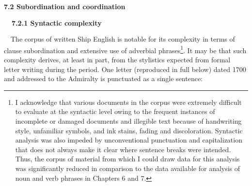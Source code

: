 \begin{styleStandard}
\textbf{7.2 Subordination and coordination}
\end{styleStandard}


\begin{styleStandard}
\textbf{\ \ 7.2.1 Syntactic complexity}
\end{styleStandard}


\begin{styleStandard}
\ \ The corpus of written Ship English is notable for its complexity in terms of clause subordination and extensive use of adverbial phrases\footnote{ I acknowledge that various documents in the corpus were\textbf{ }extremely difficult to evaluate at the syntactic level owing to the frequent instances of incomplete or damaged documents and illegible text because of handwriting style, unfamiliar symbols, and ink stains, fading and discoloration. Syntactic analysis was also impeded by unconventional punctuation and capitalization that does not always make it clear where sentence breaks were intended. Thus, the corpus of material from which I could draw data for this analysis was significantly reduced in comparison to the data available for analysis of noun and verb phrases in Chapters 6 and 7. }. It may be that such complexity derives, at least in part, from the stylistics expected from formal letter writing during the period. One letter (reproduced in full below) dated 1700 and addressed to the Admiralty is punctuated as a single sentence: 
\end{styleStandard}


